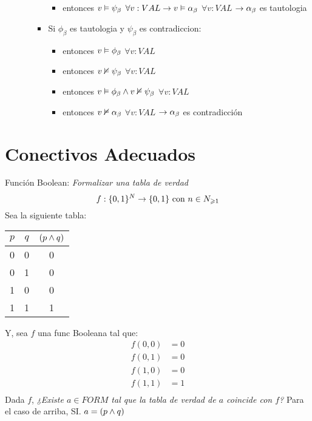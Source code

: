 \documentclass[14pt,a4paper,fleqn]{article}
\begin{document}
\begin{itemize}
\begin{itemize}
\begin{itemize}
\begin{itemize}
				 \item entonces $v \vDash \psi_{\beta}$ $\forall v: VAL \rightarrow v \vDash \alpha_{\beta}$ $\forall v:VAL$ $ \rightarrow  \alpha_{\beta}$ es tautologia 
			\end{itemize}
			\item Si $\phi_{\beta}$ es tautologia y $\psi_{\beta}$ es contradiccion:
			\begin{itemize}
				 \item entonces $v \vDash \phi_{\beta}$ $\forall v: VAL $
				 \item entonces $v \nvDash \psi_{\beta}$ $\forall v: VAL $				 
 				 \item entonces $v \vDash \phi_{\beta} \wedge v \nvDash \psi_{\beta}$ $\forall v: VAL $
				 \item entonces $v \nvDash \alpha_{\beta}$ $\forall v:VAL$ $ \rightarrow \alpha_{\beta}$ es contradicción
			\end{itemize}			
		\end{itemize}
	\end{itemize}
\end{itemize}

\section*{Conectivos Adecuados}
Función Boolean: \textit{Formalizar una tabla de verdad}
\begin{equation*}
	f:\{0,1\}^N \rightarrow \{0,1\} \text{ con } n \in N_{\geqslant 1}
\end{equation*}
Sea la siguiente tabla:\\
\begin{center}
\begin{tabular}{c|c|c}

$p$ &$q$ & $(p \wedge q)$ \\
\hline
0 & 0 & 0 \\
0 & 1 & 0 \\
1 & 0 & 0 \\
1 & 1 & 1 \\

\end{tabular}
\end{center}
Y, sea $f$ una func Booleana tal que:
\begin{align*}
	f(0,0) &= 0 \\
	f(0,1) &= 0 \\
	f(1,0) &= 0 \\
	f(1,1) &= 1 \\		
\end{align*}
Dada $f$, \emph{¿Existe $a \in FORM$ tal que la tabla de verdad de $a$ coincide con $f$?}
Para el caso de arriba, SI. $a=(p \wedge q)$
\end{document}
